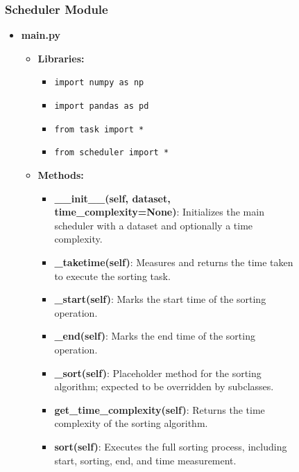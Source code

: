 \documentclass{article}
\begin{document}
\begin{figure}[h!]
\subsubsection{Scheduler Module}
    \begin{itemize}
        \item \textbf{main.py}
        \begin{itemize}
            \item \textbf{Libraries:}
            \begin{itemize}
                \item \texttt{import numpy as np}
                \item \texttt{import pandas as pd}
                \item \texttt{from task import *}
                \item \texttt{from scheduler import *}
            \end{itemize}
            \item \textbf{Methods:}
            \begin{itemize}
                \item \textbf{\_\_init\_\_(self, dataset, time\_complexity=None)}: Initializes the main scheduler with a dataset and optionally a time complexity.
                \item \textbf{\_taketime(self)}: Measures and returns the time taken to execute the sorting task.
                \item \textbf{\_start(self)}: Marks the start time of the sorting operation.
                \item \textbf{\_end(self)}: Marks the end time of the sorting operation.
                \item \textbf{\_sort(self)}: Placeholder method for the sorting algorithm; expected to be overridden by subclasses.
                \item \textbf{get\_time\_complexity(self)}: Returns the time complexity of the sorting algorithm.
                \item \textbf{sort(self)}: Executes the full sorting process, including start, sorting, end, and time measurement.
            \end{itemize}
        \end{itemize}


\end{itemize}
\end{figure}
\end{document}
